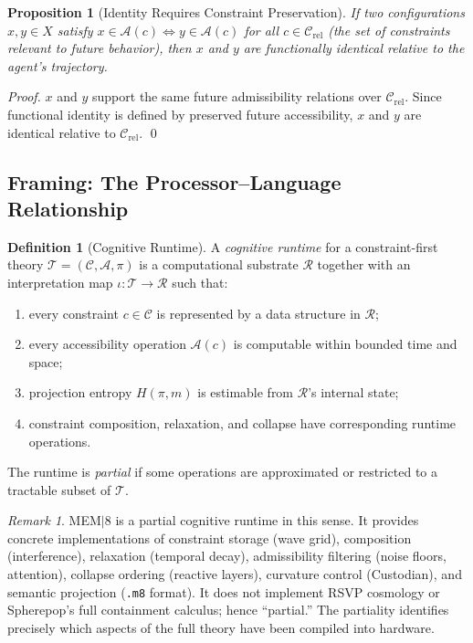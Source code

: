 \documentclass[12pt, a4paper, twoside]{article}
\theoremstyle{plain}
\newtheorem{proposition}[theorem]{Proposition}
\theoremstyle{definition}
\newtheorem{definition}[theorem]{Definition}
\theoremstyle{remark}
\newtheorem{remark}[theorem]{Remark}
\newcommand{\Acc}{\mathcal{A}}
\newcommand{\Conf}{\mathcal{C}}
\newcommand{\Proj}{\pi}
\newcommand{\Ent}{H}
\begin{document}
\begin{proposition}[Identity Requires Constraint Preservation]
\label{prop:identity_constraints}
If two configurations $x, y \in X$ satisfy $x \in \Acc(c) \iff y \in \Acc(c)$
for all $c \in \mathcal{C}_{\mathrm{rel}}$ (the set of constraints relevant to
future behavior), then $x$ and $y$ are functionally identical relative to the
agent's trajectory.
\end{proposition}

\begin{proof}
$x$ and $y$ support the same future admissibility relations over
$\mathcal{C}_{\mathrm{rel}}$. Since functional identity is defined by preserved
future accessibility, $x$ and $y$ are identical relative to
$\mathcal{C}_{\mathrm{rel}}$. \qed
\end{proof}

\subsection{Framing: The Processor--Language Relationship}

\begin{definition}[Cognitive Runtime]
\label{def:cognitive_runtime}
A \emph{cognitive runtime} for a constraint-first theory $\mathcal{T} =
(\Conf, \Acc, \Proj)$ is a computational substrate $\mathcal{R}$ together
with an interpretation map $\iota: \mathcal{T} \to \mathcal{R}$ such that:
\begin{enumerate}[label=(\roman*)]
  \item every constraint $c \in \mathcal{C}$ is represented by a data structure
    in $\mathcal{R}$;
  \item every accessibility operation $\Acc(c)$ is computable within bounded
    time and space;
  \item projection entropy $\Ent(\Proj, m)$ is estimable from $\mathcal{R}$'s
    internal state;
  \item constraint composition, relaxation, and collapse have corresponding
    runtime operations.
\end{enumerate}
The runtime is \emph{partial} if some operations are approximated or restricted
to a tractable subset of $\mathcal{T}$.
\end{definition}

\begin{remark}
MEM$|$8 is a partial cognitive runtime in this sense. It provides concrete
implementations of constraint storage (wave grid), composition (interference),
relaxation (temporal decay), admissibility filtering (noise floors, attention),
collapse ordering (reactive layers), curvature control (Custodian), and semantic
projection (\texttt{.m8} format). It does not implement RSVP cosmology or
Spherepop's full containment calculus; hence ``partial.'' The partiality
identifies precisely which aspects of the full theory have been compiled into
hardware.
\end{remark}
\end{document}
